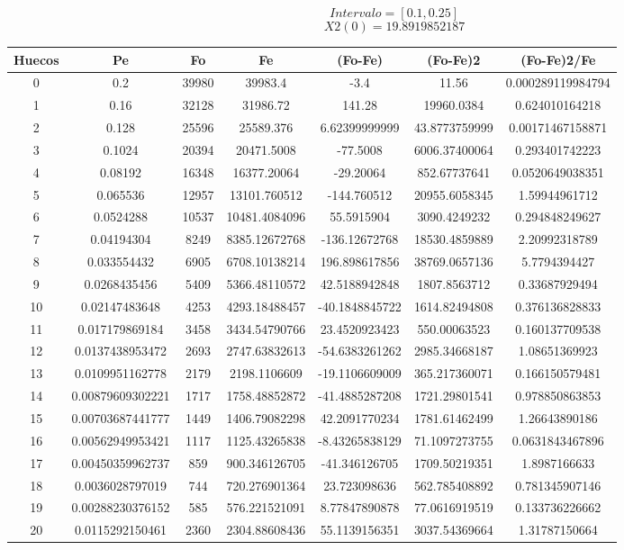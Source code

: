 \documentclass{article}
\begin{document}
$$
Intervalo = [0.1, 0.25]
$$
$$
X2(0) = 19.8919852187
$$
\begin{tabular}{|c|c|c|c|c|c|c|}
Huecos&Pe&Fo&Fe&(Fo{-}Fe)&(Fo{-}Fe)2&(Fo{-}Fe)2/Fe\\
\hline
0&0.2&39980&39983.4&{-}3.4&11.56&0.000289119984794\\
\hline
1&0.16&32128&31986.72&141.28&19960.0384&0.624010164218\\
\hline
2&0.128&25596&25589.376&6.62399999999&43.8773759999&0.00171467158871\\
\hline
3&0.1024&20394&20471.5008&{-}77.5008&6006.37400064&0.293401742223\\
\hline
4&0.08192&16348&16377.20064&{-}29.20064&852.67737641&0.0520649038351\\
\hline
5&0.065536&12957&13101.760512&{-}144.760512&20955.6058345&1.59944961712\\
\hline
6&0.0524288&10537&10481.4084096&55.5915904&3090.4249232&0.294848249627\\
\hline
7&0.04194304&8249&8385.12672768&{-}136.12672768&18530.4859889&2.20992318789\\
\hline
8&0.033554432&6905&6708.10138214&196.898617856&38769.0657136&5.7794394427\\
\hline
9&0.0268435456&5409&5366.48110572&42.5188942848&1807.8563712&0.33687929494\\
\hline
10&0.02147483648&4253&4293.18488457&{-}40.1848845722&1614.82494808&0.376136828833\\
\hline
11&0.017179869184&3458&3434.54790766&23.4520923423&550.00063523&0.160137709538\\
\hline
12&0.0137438953472&2693&2747.63832613&{-}54.6383261262&2985.34668187&1.08651369923\\
\hline
13&0.0109951162778&2179&2198.1106609&{-}19.1106609009&365.217360071&0.166150579481\\
\hline
14&0.00879609302221&1717&1758.48852872&{-}41.4885287208&1721.29801541&0.978850863853\\
\hline
15&0.00703687441777&1449&1406.79082298&42.2091770234&1781.61462499&1.26643890186\\
\hline
16&0.00562949953421&1117&1125.43265838&{-}8.43265838129&71.1097273755&0.0631843467896\\
\hline
17&0.00450359962737&859&900.346126705&{-}41.346126705&1709.50219351&1.8987166633\\
\hline
18&0.0036028797019&744&720.276901364&23.723098636&562.785408892&0.781345907146\\
\hline
19&0.00288230376152&585&576.221521091&8.77847890878&77.0616919519&0.133736226662\\
\hline
20&0.0115292150461&2360&2304.88608436&55.1139156351&3037.54369664&1.31787150664\\
\end{tabular}
\end{document}
